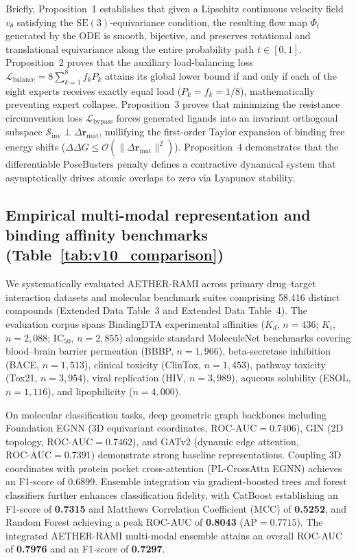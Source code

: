 \documentclass[11pt,a4paper]{article}
\begin{document}
Briefly, Proposition~1 establishes that given a Lipschitz continuous velocity field $v_\theta$ satisfying the $\mathrm{SE}(3)$-equivariance condition, the resulting flow map $\Phi_t$ generated by the ODE is smooth, bijective, and preserves rotational and translational equivariance along the entire probability path $t \in [0, 1]$. Proposition~2 proves that the auxiliary load-balancing loss $\mathcal{L}_{\text{balance}} = 8 \sum_{k=1}^8 f_k P_k$ attains its global lower bound if and only if each of the eight experts receives exactly equal load ($P_k = f_k = 1/8$), mathematically preventing expert collapse. Proposition~3 proves that minimizing the resistance circumvention loss $\mathcal{L}_{\text{bypass}}$ forces generated ligands into an invariant orthogonal subspace $\mathcal{S}_{\text{inv}} \perp \Delta \mathbf{r}_{\text{mut}}$, nullifying the first-order Taylor expansion of binding free energy shifts ($\Delta \Delta G \le \mathcal{O}(\|\Delta \mathbf{r}_{\text{mut}}\|^2)$). Proposition~4 demonstrates that the differentiable PoseBusters penalty defines a contractive dynamical system that asymptotically drives atomic overlaps to zero via Lyapunov stability.

\subsection*{Empirical multi-modal representation and binding affinity benchmarks (Table~\ref{tab:v10_comparison})}


We systematically evaluated AETHER-RAMI across primary drug--target interaction datasets and molecular benchmark suites comprising 58,416 distinct compounds (Extended Data Table~3 and Extended Data Table~4). The evaluation corpus spans BindingDTA experimental affinities ($K_d$, $n=436$; $K_i$, $n=2,088$; $\text{IC}_{50}$, $n=2,855$) alongside standard MoleculeNet benchmarks covering blood--brain barrier permeation (BBBP, $n=1,966$), beta-secretase inhibition (BACE, $n=1,513$), clinical toxicity (ClinTox, $n=1,453$), pathway toxicity (Tox21, $n=3,954$), viral replication (HIV, $n=3,989$), aqueous solubility (ESOL, $n=1,116$), and lipophilicity ($n=4,000$).

On molecular classification tasks, deep geometric graph backbones including Foundation EGNN (3D equivariant coordinates, $\text{ROC-AUC} = 0.7406$), GIN (2D topology, $\text{ROC-AUC} = 0.7462$), and GATv2 (dynamic edge attention, $\text{ROC-AUC} = 0.7391$) demonstrate strong baseline representations. Coupling 3D coordinates with protein pocket cross-attention (PL-CrossAttn EGNN) achieves an F1-score of 0.6899. Ensemble integration via gradient-boosted trees and forest classifiers further enhances classification fidelity, with CatBoost establishing an F1-score of \textbf{0.7315} and Matthews Correlation Coefficient (MCC) of \textbf{0.5252}, and Random Forest achieving a peak ROC-AUC of \textbf{0.8043} ($\text{AP} = 0.7715$). The integrated AETHER-RAMI multi-modal ensemble attains an overall ROC-AUC of \textbf{0.7976} and an F1-score of \textbf{0.7297}.
\end{document}
